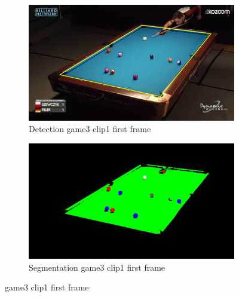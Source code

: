 \begin{figure}[H]
    \centering
    \begin{subfigure}[b]{0.35\textwidth}
        \centering
        \includegraphics[width=\textwidth]{images/Detection/game3_clip1_detected_balls_first_frame.jpg}
        \caption{Detection game3 clip1 first frame}
        \label{fig: game3_clip1_first_frame_detected}
    \end{subfigure}
    \begin{subfigure}[b]{0.35\textwidth}
        \centering
        \includegraphics[width=\textwidth]{images/Segmentation/game3_clip1_segmented_balls_first_frame.jpg}
        \caption{Segmentation game3 clip1 first frame}
		\label{fig: game3_clip1_first_frame_segmented}
    \end{subfigure}
	\caption{game3 clip1 first frame}
\end{figure}

